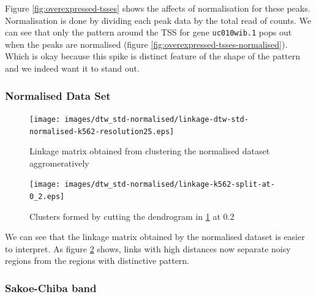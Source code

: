 \documentclass[10pt,a4paper]{article}
\begin{document}
Figure \ref{fig:overexpressed-tsses} shows the affects of normalisation for these peaks. Normalisation is done by dividing each peak data by the total read of counts.
We can see that only the pattern around the TSS for gene \verb#uc010wib.1# pops out when the peaks are normalised (figure \ref{fig:overexpressed-tsses-normalised}).
Which is okay because this spike is distinct feature of the shape of the pattern and we indeed want it to stand out.

\subsubsection{Normalised Data Set}

\begin{figure}
\centering
\texttt{[image: images/dtw\_std-normalised/linkage-dtw-std-normalised-k562-resolution25.eps]}
\caption{Linkage matrix obtained from clustering the normalised dataset aggromeratively}
\label{fig:dendrogram-normalised}
\end{figure}

\begin{figure}
\centering
\texttt{[image: images/dtw\_std-normalised/linkage-k562-split-at-0\_2.eps]}
\caption{Clusters formed by cutting the dendrogram in \ref{fig:dendrogram-normalised} at 0.2}
\label{fig:dendrogram-normalised-cut-0.2}
\end{figure}

We can see that the linkage matrix obtained by the normalised dataset is easier to interpret. As figure \ref{fig:dendrogram-normalised-cut-0.2} shows, links with high distances now separate noisy regions from the regions with distinctive pattern.

\subsubsection{Sakoe-Chiba band}
\end{document}

